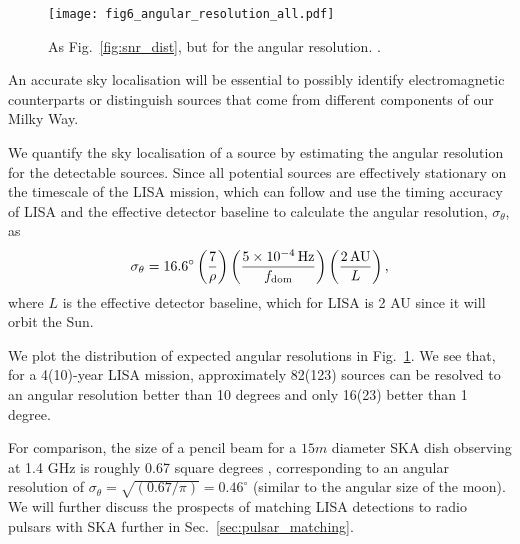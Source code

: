 \begin{figure}[htb]
    \centering
    \texttt{[image: fig6\_angular\_resolution\_all.pdf]}
    \caption{As Fig.~\ref{fig:snr_dist}, but for the angular resolution. \href{https://github.com/TomWagg/detecting-DCOs-in-LISA/blob/main/paper/figures/fig6_angular_resolution_all.pdf}{\faFileImage} \href{https://github.com/TomWagg/detecting-DCOs-in-LISA/blob/main/paper/figure_notebooks/fiducial.ipynb}{\faBook}.}
    \label{fig:ang_res}
\end{figure}

An accurate sky localisation will be essential to possibly identify electromagnetic counterparts or distinguish sources that come from different components of our Milky Way. 

We quantify the sky localisation of a source by estimating the angular resolution for the detectable sources. Since all potential sources are effectively stationary on the timescale of the LISA mission, which can follow \citet{Mandel+2018} and use the timing accuracy of LISA and the effective detector baseline to calculate the angular resolution, $\sigma_{\theta}$, as
\begin{equation}
    \sigma_{\theta} = 16.6^\circ \left(\frac{7}{\rho}\right) \left(\frac{5 \times 10^{-4} \unit{Hz}}{f_{\rm dom}}\right) \left( \frac{2 \unit{AU}}{L} \right),
\end{equation}
where $L$ is the effective detector baseline, which for LISA is 2 AU since it will orbit the Sun.

We plot the distribution of expected angular resolutions in Fig.~\ref{fig:ang_res}. We see that, for a 4(10)-year LISA mission, approximately 82(123) sources can be resolved to an angular resolution better than 10 degrees and only 16(23) better than 1 degree. 

For comparison, the size of a pencil beam for a $15 \unit{m}$ diameter SKA dish observing at 1.4 GHz is roughly 0.67 square degrees \citep{Smits+2009}, corresponding to an angular resolution of $\sigma_\theta = \sqrt{(0.67 / \pi)} = 0.46^\circ$ (similar to the angular size of the moon). We will further discuss the prospects of matching LISA detections to radio pulsars with SKA further in Sec.~\ref{sec:pulsar_matching}.